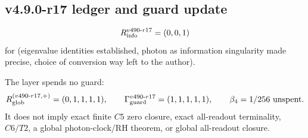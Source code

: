 \subsection*{v4.9.0-r17 ledger and guard update}
\label{subsec:v490-r17-ledger-guard}

\[
R_{\rm info}^{v490\text{-}r17}=(0,0,1)
\]
for (eigenvalue identities established, photon as information singularity made precise, choice of conversion way left to the
author).

The layer spends no guard:
\[
R_{\rm glob}^{(v490\text{-}r17,+)}=(0,1,1,1,1),
\qquad
\Gamma_{\rm guard}^{v490\text{-}r17}=(1,1,1,1,1),
\qquad
\beta_4=1/256\ \text{unspent}.
\]
It does not imply exact finite \(C5\) zero closure, exact all-readout terminality,
\(C6/T2\), a global photon-clock/RH theorem, or global all-readout closure.

